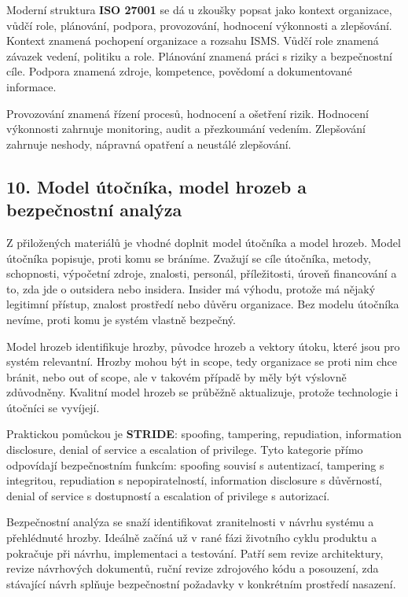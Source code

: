 Moderní struktura \textbf{ISO 27001} se dá u zkoušky popsat jako kontext organizace, vůdčí role, plánování, podpora, provozování, hodnocení výkonnosti a zlepšování. Kontext znamená pochopení organizace a rozsahu ISMS. Vůdčí role znamená závazek vedení, politiku a role. Plánování znamená práci s riziky a bezpečnostní cíle. Podpora znamená zdroje, kompetence, povědomí a dokumentované informace.

Provozování znamená řízení procesů, hodnocení a ošetření rizik. Hodnocení výkonnosti zahrnuje monitoring, audit a přezkoumání vedením. Zlepšování zahrnuje neshody, nápravná opatření a neustálé zlepšování.

\subsection*{10. Model útočníka, model hrozeb a bezpečnostní analýza}

Z přiložených materiálů je vhodné doplnit model útočníka a model hrozeb. Model útočníka popisuje, proti komu se bráníme. Zvažují se cíle útočníka, metody, schopnosti, výpočetní zdroje, znalosti, personál, příležitosti, úroveň financování a to, zda jde o outsidera nebo insidera. Insider má výhodu, protože má nějaký legitimní přístup, znalost prostředí nebo důvěru organizace. Bez modelu útočníka nevíme, proti komu je systém vlastně bezpečný.

Model hrozeb identifikuje hrozby, původce hrozeb a vektory útoku, které jsou pro systém relevantní. Hrozby mohou být in scope, tedy organizace se proti nim chce bránit, nebo out of scope, ale v takovém případě by měly být výslovně zdůvodněny. Kvalitní model hrozeb se průběžně aktualizuje, protože technologie i útočníci se vyvíjejí.

Praktickou pomůckou je \textbf{STRIDE}: spoofing, tampering, repudiation, information disclosure, denial of service a escalation of privilege. Tyto kategorie přímo odpovídají bezpečnostním funkcím: spoofing souvisí s autentizací, tampering s integritou, repudiation s nepopiratelností, information disclosure s důvěrností, denial of service s dostupností a escalation of privilege s autorizací.

Bezpečnostní analýza se snaží identifikovat zranitelnosti v návrhu systému a přehlédnuté hrozby. Ideálně začíná už v rané fázi životního cyklu produktu a pokračuje při návrhu, implementaci a testování. Patří sem revize architektury, revize návrhových dokumentů, ruční revize zdrojového kódu a posouzení, zda stávající návrh splňuje bezpečnostní požadavky v konkrétním prostředí nasazení.

